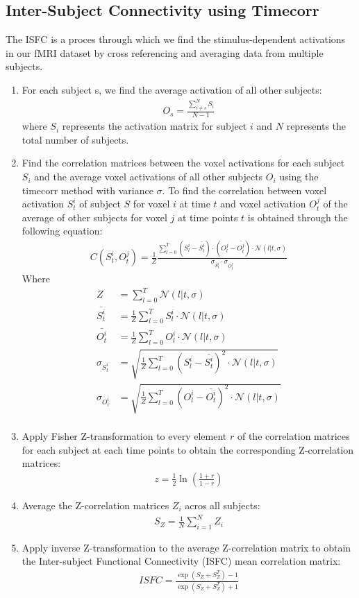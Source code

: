 \documentclass[12pt]{article}
\begin{document}
\subsection{Inter-Subject Connectivity using Timecorr}
The ISFC is a proces through which we find the stimulus-dependent activations in our fMRI dataset by cross referencing and averaging data from multiple subjects.\\
\begin{enumerate}
\item For each subject s, we find the average activation of all other subjects:
\begin{align*}
O_s=\frac{\sum_{i\neq s}^N S_i}{N-1}
\end{align*}
where $S_i$ represents the activation matrix for subject $i$ and $N$ represents the total number of subjects.
\item Find the correlation matrices between the voxel activations for each subject $S_i$ and the average voxel activations of all other subjects $O_{i}$ using the timecorr method with variance $\sigma$. To find the correlation between voxel activation $S^i_t$ of subject $S$ for voxel $i$ at time $t$ and voxel activation $O^j_t$ of the average of other subjects for voxel $j$ at time points $t$ is obtained through the following equation:
\begin{align*}
C(S^i_t,O^j_t) = \frac{1}{Z}\frac{\sum_{l=0}^T (S_l^i - \bar{S^i_t})\cdot(O^j_l - \bar{O^j_t})\cdot \mathcal{N}(l|t,\sigma)}{\sigma_{S_t^i} \cdot \sigma_{O_t^j}}
\end{align*}
Where
\begin{align*}
Z &= \sum_{l=0}^T \mathcal{N}(l|t,\sigma)\\
\bar{S^i_t} &=\frac{1}{Z} \sum_{l=0}^T S^i_l \cdot \mathcal{N}(l|t,\sigma)\\
\bar{O^i_t} &=\frac{1}{Z} \sum_{l=0}^T O^i_l \cdot \mathcal{N}(l|t,\sigma)\\
\sigma_{S_t^i} &=\sqrt{ \frac{1}{Z}\sum_{l=0}^T (S_l^i-\bar{S_t^i})^2 \cdot \mathcal{N}(l|t,\sigma)}\\
\sigma_{O_t^i} &=\sqrt{ \frac{1}{Z}\sum_{l=0}^T (O_l^i-\bar{O_t^i})^2 \cdot \mathcal{N}(l|t,\sigma)}\\
\end{align*}
\item Apply Fisher Z-transformation to every element $r$ of the correlation matrices for each subject at each time points to obtain the corresponding Z-correlation matrices:
\begin{align*}
z = \frac{1}{2}\ln(\frac{1+r}{1-r})
\end{align*}
\item Average the Z-correlation matrices $Z_i$ acros all subjects:
\begin{align*}
S_Z = \frac{1}{N}\sum^N_{i=1}Z_i
\end{align*}
\item Apply inverse Z-transformation to the average Z-correlation matrix to obtain the Inter-subject Functional Connectivity (ISFC) mean correlation matrix:
\begin{align*}
ISFC = \frac{\exp(S_Z+S_Z^T)-1}{\exp(S_Z+S_Z^T)+1}
\end{align*}
\end{enumerate}
\end{document}
